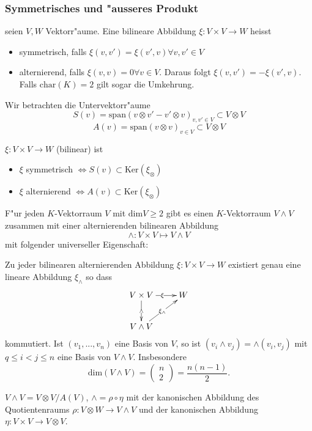\documentclass[11pt, a4paper]{article}
\begin{document}
\subsubsection{Symmetrisches und "ausseres Produkt}
\begin{definition}
seien $V, W$ Vektorr"aume.
Eine bilineare Abbildung 
$
\xi : V \times V \rightarrow W
$
heisst 
\begin{itemize}
\item symmetrisch, falls $\xi( v, v') = \xi (v', v) \forall v, v' \in V$
\item alternierend, falls $\xi (v, v) = 0 \forall v \in V$. Daraus folgt $\xi(v, v') = - \xi(v' ,v)$. Falls  $\mathrm{char}(K) = 2$ gilt  sogar die Umkehrung.
\end{itemize}
\end{definition}
\begin{lemma}
Wir betrachten die Untervektorr"aume 
$$
S(v) = \mathrm{span} (v \otimes v' - v' \otimes v)_{v, v' \in V} \subset V \otimes V
$$
$$
A(v) =  \mathrm{span} (v \otimes v)_{v \in V} \subset V \otimes V
$$


$\xi : V \times V \rightarrow W$ (bilinear) ist 
\begin{itemize}
\item $\xi$ symmetrisch $\Leftrightarrow S(v) \subset \mathrm{Ker}(\xi_\otimes)$
\item $\xi$ alternierend $\Leftrightarrow A(v) \subset \mathrm{Ker}(\xi_\otimes)$
\end{itemize}
\end{lemma}


\begin{theorem}
F"ur jeden $K$-Vektorraum $V$ mit $\mathrm{dim} V \geq 2$ gibt es einen $K$-Vektorraum $V \wedge V$ zusammen mit einer alternierenden bilinearen Abbildung 
$$\wedge: V \times V \mapsto V \wedge V$$ mit folgender universeller Eigenschaft:

Zu jeder bilinearen alternierenden Abbildung $\xi: V \times V \rightarrow W$ existiert genau eine lineare Abbildung $\xi_\wedge$ so dass
\begin{gather*}
  \xymatrix{V \times V  \ar[d]|{\wedge} \ar[r]|{\xi} & W\\
    V \wedge V \ar[ur]|{\xi_\wedge} & }
\end{gather*}
kommutiert.
Ist $(v_1, ..., v_n)$ eine Basis von $V$, so ist $(v_i \wedge v_j) = \wedge(v_i, v_j)$ mit $q \leq i < j \leq n$ eine Basis von $V \wedge V$. Insbesondere 
$$
\mathrm{dim}(V \wedge V) = \left(\begin{array}{c} n\\ 2 
\end{array} \right) = \frac{n(n-1)}{2}.
$$
\end{theorem}
$V \wedge V = V \otimes V / A(V)$, $\wedge = \rho \circ \eta$ mit der kanonischen Abbildung des Quotientenraums $\rho: V \otimes W \rightarrow V \wedge V$ und der kanonischen Abbildung $\eta: V \times V \rightarrow V \otimes V$.
\end{document}
